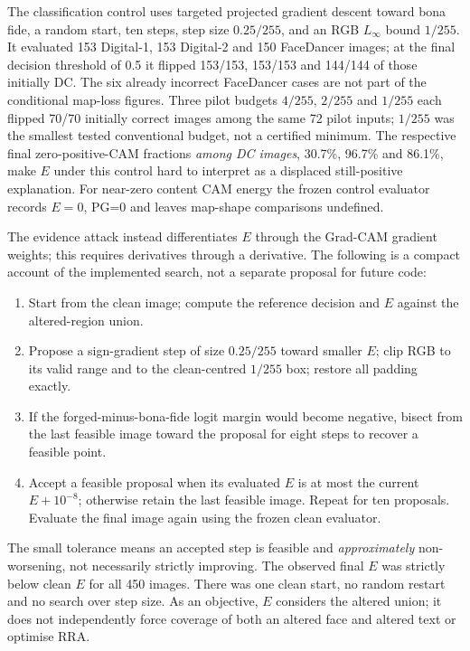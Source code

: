 The classification control uses targeted projected gradient descent toward bona fide, a random start, ten steps, step size $0.25/255$, and an RGB $L_\infty$ bound $1/255$. It evaluated 153 Digital-1, 153 Digital-2 and 150 FaceDancer images; at the final decision threshold of 0.5 it flipped 153/153, 153/153 and 144/144 of those initially DC. The six already incorrect FaceDancer cases are not part of the conditional map-loss figures. Three pilot budgets $4/255$, $2/255$ and $1/255$ each flipped 70/70 initially correct images among the same 72 pilot inputs; $1/255$ was the smallest tested conventional budget, not a certified minimum. The respective final zero-positive-CAM fractions \emph{among DC images}, 30.7\%, 96.7\% and 86.1\%, make $E$ under this control hard to interpret as a displaced still-positive explanation. For near-zero content CAM energy the frozen control evaluator records $E=0$, PG=0 and leaves map-shape comparisons undefined.

The evidence attack instead differentiates $E$ through the Grad-CAM gradient weights; this requires derivatives through a derivative. The following is a compact account of the implemented search, not a separate proposal for future code:
\begin{enumerate}
    \item Start from the clean image; compute the reference decision and $E$ against the altered-region union.
    \item Propose a sign-gradient step of size $0.25/255$ toward smaller $E$; clip RGB to its valid range and to the clean-centred $1/255$ box; restore all padding exactly.
    \item If the forged-minus-bona-fide logit margin would become negative, bisect from the last feasible image toward the proposal for eight steps to recover a feasible point.
    \item Accept a feasible proposal when its evaluated $E$ is at most the current $E+10^{-8}$; otherwise retain the last feasible image. Repeat for ten proposals. Evaluate the final image again using the frozen clean evaluator.
\end{enumerate}
The small tolerance means an accepted step is feasible and \emph{approximately} non-worsening, not necessarily strictly improving. The observed final $E$ was strictly below clean $E$ for all 450 images. There was one clean start, no random restart and no search over step size. As an objective, $E$ considers the altered union; it does not independently force coverage of both an altered face and altered text or optimise RRA.

